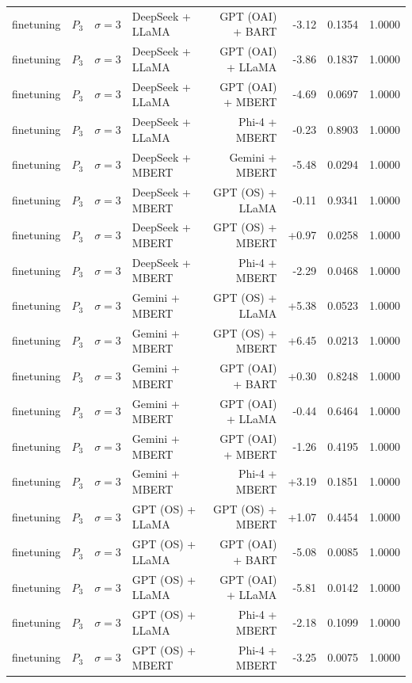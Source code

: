 \begin{table}[htbp]
\begin{tabular*}{\textwidth}{@{\extracolsep{\fill}}llllrrrl}
finetuning & $P_3$ & $\sigma{=}3$ & DeepSeek + LLaMA & GPT (OAI) + BART & -3.12 & 0.1354 & 1.0000 \\
finetuning & $P_3$ & $\sigma{=}3$ & DeepSeek + LLaMA & GPT (OAI) + LLaMA & -3.86 & 0.1837 & 1.0000 \\
finetuning & $P_3$ & $\sigma{=}3$ & DeepSeek + LLaMA & GPT (OAI) + MBERT & -4.69 & 0.0697 & 1.0000 \\
finetuning & $P_3$ & $\sigma{=}3$ & DeepSeek + LLaMA & Phi-4 + MBERT & -0.23 & 0.8903 & 1.0000 \\
finetuning & $P_3$ & $\sigma{=}3$ & DeepSeek + MBERT & Gemini + MBERT & -5.48 & 0.0294 & 1.0000 \\
finetuning & $P_3$ & $\sigma{=}3$ & DeepSeek + MBERT & GPT (OS) + LLaMA & -0.11 & 0.9341 & 1.0000 \\
finetuning & $P_3$ & $\sigma{=}3$ & DeepSeek + MBERT & GPT (OS) + MBERT & +0.97 & 0.0258 & 1.0000 \\
finetuning & $P_3$ & $\sigma{=}3$ & DeepSeek + MBERT & Phi-4 + MBERT & -2.29 & 0.0468 & 1.0000 \\
finetuning & $P_3$ & $\sigma{=}3$ & Gemini + MBERT & GPT (OS) + LLaMA & +5.38 & 0.0523 & 1.0000 \\
finetuning & $P_3$ & $\sigma{=}3$ & Gemini + MBERT & GPT (OS) + MBERT & +6.45 & 0.0213 & 1.0000 \\
finetuning & $P_3$ & $\sigma{=}3$ & Gemini + MBERT & GPT (OAI) + BART & +0.30 & 0.8248 & 1.0000 \\
finetuning & $P_3$ & $\sigma{=}3$ & Gemini + MBERT & GPT (OAI) + LLaMA & -0.44 & 0.6464 & 1.0000 \\
finetuning & $P_3$ & $\sigma{=}3$ & Gemini + MBERT & GPT (OAI) + MBERT & -1.26 & 0.4195 & 1.0000 \\
finetuning & $P_3$ & $\sigma{=}3$ & Gemini + MBERT & Phi-4 + MBERT & +3.19 & 0.1851 & 1.0000 \\
finetuning & $P_3$ & $\sigma{=}3$ & GPT (OS) + LLaMA & GPT (OS) + MBERT & +1.07 & 0.4454 & 1.0000 \\
finetuning & $P_3$ & $\sigma{=}3$ & GPT (OS) + LLaMA & GPT (OAI) + BART & -5.08 & 0.0085 & 1.0000 \\
finetuning & $P_3$ & $\sigma{=}3$ & GPT (OS) + LLaMA & GPT (OAI) + LLaMA & -5.81 & 0.0142 & 1.0000 \\
finetuning & $P_3$ & $\sigma{=}3$ & GPT (OS) + LLaMA & Phi-4 + MBERT & -2.18 & 0.1099 & 1.0000 \\
finetuning & $P_3$ & $\sigma{=}3$ & GPT (OS) + MBERT & Phi-4 + MBERT & -3.25 & 0.0075 & 1.0000 \\

\end{tabular*}
\end{table}
